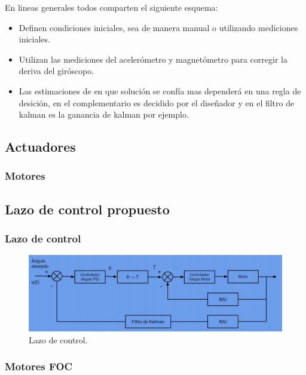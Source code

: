 En lineas generales todos comparten el siguiente esquema:
\begin{itemize}
\item Definen condiciones iniciales, sea de manera manual o utilizando mediciones iniciales.
\item Utilizan las mediciones del aceler\'ometro y magnet\'ometro para corregir la deriva del gir\'oscopo.
\item Las estimaciones de en que soluci\'on se conf\'ia mas depender\'a en una regla de desici\'on, en el complementario es decidido por el diseñador y en el filtro de kalman es la ganancia de kalman por ejemplo.
\end{itemize}
\subsection{Actuadores}
\subsubsection{Motores}
\subsection{Lazo de control propuesto}
\subsubsection{Lazo de control}
\begin{figure}[H]
	\center
	\includegraphics[width=0.8\linewidth, page=1]{Imagenes/lazo_de_control}
	\caption{Lazo de control.}
	\label{fig:control:lazo}
\end{figure}

\subsubsection{Motores FOC}




